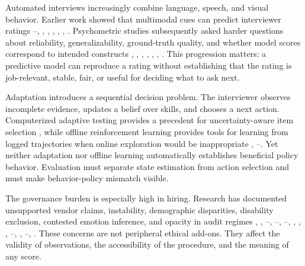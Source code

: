 \documentclass[journal]{IEEEtran}
\begin{document}
Automated interviews increasingly combine language, speech, and visual behavior. Earlier work showed that multimodal cues can predict interviewer ratings \cite{hemamou2019hirenet}--\cite{naim2018automated}, \cite{hemamou2023multimodal}, \cite{nguyen2014hireme}, \cite{chen2016monologue}, \cite{lv2024window}, \cite{suen2020agent}, \cite{chen2016doc2vec}. Psychometric studies subsequently asked harder questions about reliability, generalizability, ground-truth quality, and whether model scores correspond to intended constructs \cite{hickman2022personality}, \cite{liff2024psychometric}, \cite{hickman2025smart}, \cite{koutsoumpis2024psychometric}, \cite{hickman2024training}, \cite{hickman2021language}, \cite{zhang2025personality}. This progression matters: a predictive model can reproduce a rating without establishing that the rating is job-relevant, stable, fair, or useful for deciding what to ask next.


Adaptation introduces a sequential decision problem. The interviewer observes incomplete evidence, updates a belief over skills, and chooses a next action. Computerized adaptive testing provides a precedent for uncertainty-aware item selection \cite{li2026deepcat}, while offline reinforcement learning provides tools for learning from logged trajectories when online exploration would be inappropriate \cite{kostrikov2021iql}, \cite{thomas2015hcope}--\cite{patterson2023empirical}. Yet neither adaptation nor offline learning automatically establishes beneficial policy behavior. Evaluation must separate state estimation from action selection and must make behavior-policy mismatch visible.


The governance burden is especially high in hiring. Research has documented unsupported vendor claims, instability, demographic disparities, disability exclusion, contested emotion inference, and opacity in audit regimes \cite{raghavan2020bias}, \cite{tippins2021concerns}, \cite{rhea2022stability}--\cite{fabris2025survey}, \cite{luria2026disability}--\cite{wilson2021fairalgorithms}, \cite{hunkenschroer2022ethics}--\cite{aizenberg2023autonomy}, \cite{ingber2025emotion}, \cite{roemmich2023values}, \cite{kassir2022context}, \cite{li2021practice}--\cite{gerchick2025audits}, \cite{fisher2024disability}, \cite{yam2021impact}--\cite{roemmich2023privacy}, \cite{raji2022oversight}. These concerns are not peripheral ethical add-ons. They affect the validity of observations, the accessibility of the procedure, and the meaning of any score.
\end{document}
